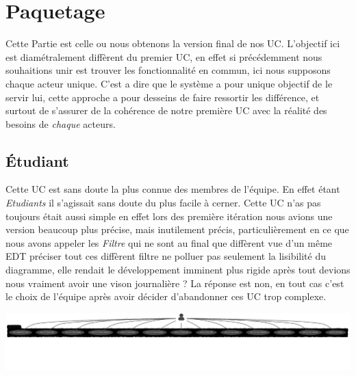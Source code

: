 \documentclass[a4paper,french,final]{memoir}
\begin{document}
\section{Paquetage}
Cette Partie est celle ou nous obtenons la version final de nos UC. L'objectif ici est diamétralement diffèrent du premier UC, en effet si précédemment nous souhaitions unir est trouver les fonctionnalité en commun, ici nous supposons chaque acteur unique. C'est a dire
que le système a pour unique objectif de le servir lui, cette approche a pour desseins
de faire ressortir les différence, et surtout de s'assurer de la cohérence de notre première
UC avec la réalité des besoins de \emph{chaque} acteurs.

\subsection{Étudiant}

\begin{center}
    
\end{center}

Cette UC est sans doute la plus connue des membres de l'équipe. En effet étant \emph{Etudiants}
il s'agissait sans doute du plus facile à cerner. Cette UC n'as pas toujours était aussi
simple en effet lors des première itération nous avions une version beaucoup plus précise,
mais inutilement précis, particulièrement en ce que nous avons appeler les \emph{Filtre} qui ne sont au final que diffèrent vue d'un même EDT préciser tout ces diffèrent filtre ne polluer pas seulement la lisibilité du diagramme, elle rendait le développement imminent plus rigide
après tout devions nous vraiment avoir une vison journalière ? La réponse est non, en tout cas c'est le choix de l'équipe après avoir décider d'abandonner ces UC trop complexe.


\begin{center}
    \includegraphics[width=0.9\columnwidth]{figures/OldEtudiant.png}
\end{center}
\end{document}
